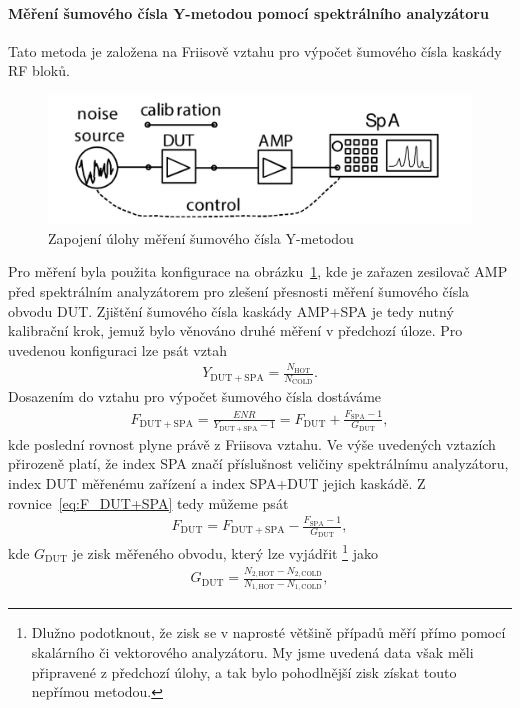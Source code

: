 \documentclass[11pt,a4paper]{article}
\begin{document}
\paragraph*{Měření šumového čísla Y-metodou pomocí spektrálního analyzátoru} Tato metoda je založena na Friisově vztahu pro výpočet šumového čísla kaskády RF bloků.
\begin{figure}[!ht]
    \centering
    \includegraphics[width=.65\textwidth]{src/task2-zapojeni.png}
    \caption{Zapojení úlohy měření šumového čísla Y-metodou}
    \label{fig:task2-zapojeni}
\end{figure}
Pro měření byla použita konfigurace na obrázku~\ref{fig:task2-zapojeni}, kde je zařazen zesilovač AMP před spektrálním analyzátorem pro zlešení přesnosti měření šumového čísla obvodu DUT. Zjištění šumového čísla kaskády AMP+SPA je tedy nutný kalibrační krok, jemuž bylo věnováno druhé měření v předchozí úloze. Pro uvedenou konfiguraci lze psát vztah
\begin{align}
    Y_{\mathrm{DUT+SPA}} = \frac{N_{\mathrm{HOT}}}{N_{\mathrm{COLD}}}.
\end{align}
Dosazením do vztahu pro výpočet šumového čísla dostáváme
\begin{align}
    \label{eq:F_DUT+SPA}
    F_{\mathrm{DUT+SPA}} = \frac{ENR}{Y_{\mathrm{DUT+SPA}}-1} = F_{\mathrm{DUT}} + \frac{F_{\mathrm{SPA}} - 1}{G_{\mathrm{DUT}}},
\end{align}
kde poslední rovnost plyne právě z Friisova vztahu. Ve výše uvedených vztazích přirozeně platí, že index SPA značí příslušnost veličiny spektrálnímu analyzátoru, index DUT měřenému zařízení a index SPA+DUT jejich kaskádě. Z rovnice~\ref{eq:F_DUT+SPA} tedy můžeme psát
\begin{align}
    F_{\mathrm{DUT}} = F_{\mathrm{DUT+SPA}} - \frac{F_{\mathrm{SPA}}-1}{G_{\mathrm{DUT}}},
\end{align}
kde $G_{\mathrm{DUT}}$ je zisk měřeného obvodu, který lze vyjádřit%
    \footnote{Dlužno podotknout, že zisk se v naprosté většině případů měří přímo pomocí skalárního či vektorového analyzátoru. My jsme uvedená data však měli připravené z předchozí úlohy, a tak bylo pohodlnější zisk získat touto nepřímou metodou.}
jako
\begin{align}
    G_{\mathrm{DUT}} = \frac{N_{2,\mathrm{HOT}} - N_{2,\mathrm{COLD}}}{N_{1,\mathrm{HOT}} - N_{1,\mathrm{COLD}}},
\end{align}
\end{document}
